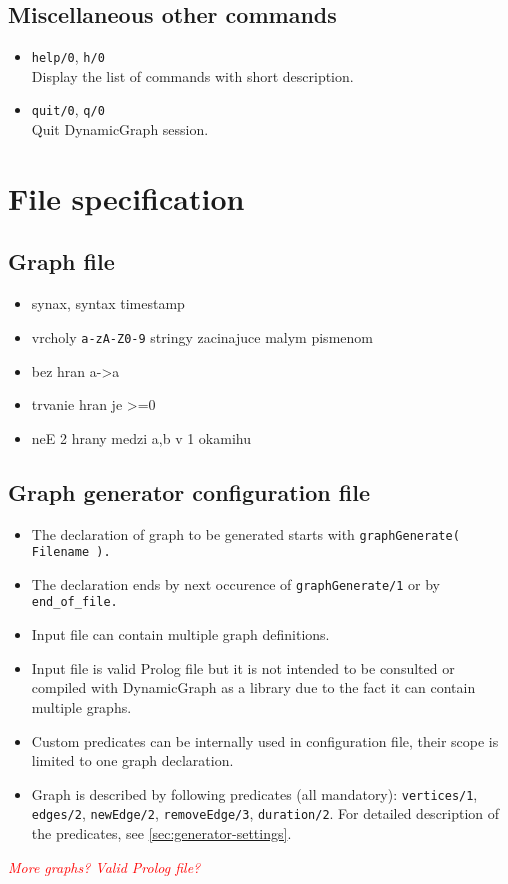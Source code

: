\documentclass[11pt, a4paper,draft]{article}
\newcommand{\pl}[1]{\texttt{#1}} %
\theoremstyle{plain}
\theoremstyle{definition}
\theoremstyle{remark}
\newcommand{\qq}[1]{\textit{\textcolor{red}{#1}}}
\begin{document}
\subsection{Miscellaneous other commands}

\begin{itemize}
\item \pl{help/0}, \pl{h/0} \\
Display the list of commands with short description.

\item \pl{quit/0}, \pl{q/0} \\
Quit DynamicGraph session.
\end{itemize}

\section{File specification}
\label{sec:files}

\subsection{Graph file}
\label{sec:files-graph}
\begin{itemize}
    \item synax, syntax timestamp
    \item vrcholy \texttt{a-zA-Z0-9} stringy zacinajuce malym pismenom
    \item bez hran a->a
    \item trvanie hran je >=0
    \item neE 2 hrany medzi a,b v 1 okamihu
\end{itemize}

\subsection{Graph generator configuration file}
\label{sec:files-generator}

\begin{itemize}
    \item The declaration of graph to be generated starts with \pl{graphGenerate( Filename ).}
    \item The declaration ends by next occurence of \pl{graphGenerate/1} or by
        \pl{end\_of\_file.}
    \item Input file can contain multiple graph definitions.
    \item Input file is valid Prolog file but it is not intended to be consulted or
        compiled with DynamicGraph as a library due to the fact it can contain multiple
        graphs.
    \item Custom predicates can be internally used in configuration file, their scope
        is limited to one graph declaration.
    \item Graph is described by following predicates (all mandatory): 
        \pl{vertices/1}, \pl{edges/2}, \pl{newEdge/2}, \pl{removeEdge/3}, \pl{duration/2}.
        For detailed description of the predicates, see \autoref{sec:generator-settings}.

\end{itemize}
\qq{More graphs? Valid Prolog file?}
\end{document}
